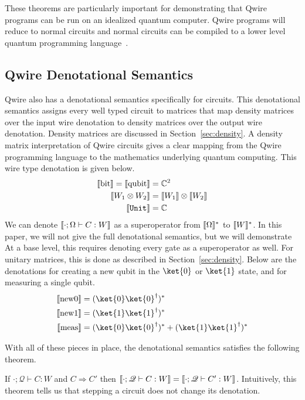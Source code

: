 These theorems are particularly important for demonstrating that Qwire programs can be run on an idealized quantum computer.
Qwire programs will reduce to normal circuits and normal circuits can be compiled to a lower level quantum programming language~\cite{qwirepractice}.

\subsection{Qwire Denotational Semantics}

Qwire also has a denotational semantics specifically for circuits.
This denotational semantics assigns every well typed circuit to matrices that map density matrices over the input wire denotation to density matrices over the output wire denotation.
Density matrices are discussed in Section~\ref{sec:density}.
A density matrix interpretation of Qwire circuits gives a clear mapping from the Qwire programming language to the mathematics underlying quantum computing.
This wire type denotation is given below.
\begin{align*}
\llbracket \text{bit} \rrbracket = \llbracket \text{qubit} \rrbracket &= \mathbb{C}^2\\
\llbracket W_1 \otimes W_2 \rrbracket &= \llbracket W_1 \rrbracket \otimes \llbracket W_2 \rrbracket\\
\llbracket \texttt{Unit} \rrbracket &= \mathbb{C}
\end{align*}
We can denote $\llbracket \cdot; \Omega \vdash C : W  \rrbracket$ as a superoperator from $\llbracket \Omega \rrbracket^*$ to $\llbracket W \rrbracket^*$.
In this paper, we will not give the full denotational semantics, but we will demonstrate
At a base level, this requires denoting every gate as a superoperator as well.
For unitary matrices, this is done as described in Section~\ref{sec:density}.
Below are the denotations for creating a new qubit in the $\ket{0}$ or $\ket{1}$ state, and for measuring a single qubit.
\begin{align*}
\denote{\text{new0}} &= (\ket{0}\ket{0}^\dagger)^*\\
\denote{\text{new1}}  &= (\ket{1}\ket{1}^\dagger)^*\\
\denote{\text{meas}}   &= (\ket{0}\ket{0}^\dagger)^* + (\ket{1}\ket{1}^\dagger)^*
\end{align*}

With all of these pieces in place, the denotational semantics satisfies the following theorem.
\begin{theorem}[Soundness]
If $\cdot;\mathscr{Q}\vdash C : W$ and $C \Rightarrow C'$ then 
$\llbracket \cdot;\mathscr{Q}\vdash C : W \rrbracket = \llbracket \cdot;\mathscr{Q}\vdash C' : W \rrbracket$.
Intuitively, this theorem tells us that stepping a circuit does not change its denotation.
\end{theorem}
